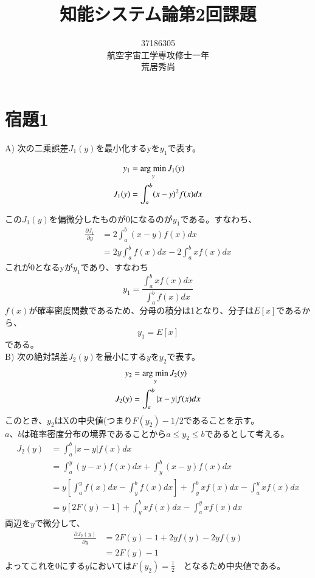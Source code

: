 \documentclass[10pt,a4paper]{ltjsarticle}       %
\title{知能システム論第2回課題}
\author{37186305\\航空宇宙工学専攻修士一年\\荒居秀尚}
\newcommand{\argmin}{\mathop{\rm arg~min}\limits}
\begin{document}
\maketitle
\section{宿題1}
A) 次の二乗誤差$J_1(y)$を最小化するyを$y_1$で表す。

\begin{align}
y_1 &= \argmin_{y} J_1(y) \\
J_1(y)&=\int_a^b (x-y)^2 f(x)dx
\end{align}

この$J_1(y)$を偏微分したものが0になるのが$y_1$である。すなわち、
\begin{align}
\frac{\partial J_1}{\partial y} &= 2\int_a^b(x-y)f(x)dx \\
 &= 2y\int_a^bf(x)dx-2\int_a^b x f(x) dx
\end{align}
これが0となるyが$y_1$であり、すなわち
\begin{equation}
y_1=\frac{\int_a^b x f(x) dx}{\int_a^bf(x)dx}
\end{equation}
$f(x)$が確率密度関数であるため、分母の積分は1となり、分子は$E[x]$であるから、
\begin{equation}
y_1=E[x]
\end{equation}
である。\\
B) 次の絶対誤差$J_2(y)$を最小にする$y$を$y_2$で表す。
\begin{align}
y_2&=\argmin_{y}J_2(y) \\
J_2(y)&=\int_a^b |x-y| f(x) dx
\end{align}
このとき、$y_2$はXの中央値(つまり$F(y_2)-1/2$であることを示す。\\

$a$、$b$は確率密度分布の境界であることから$a\le y_2\le b$であるとして考える。
\begin{align}
J_2(y) &= \int_a^b |x - y| f(x) dx \\
           &= \int_a^y (y - x) f(x) dx + \int_y^b (x - y) f(x) dx \\
           &= y\left[ \int_a^y f(x) dx - \int_y^b f(x) dx \right] + \int_y^b x f(x) dx - \int_a^y x f(x) dx \\
           &= y\left[ 2F(y) - 1 \right] + \int_y^b x f(x) dx - \int_a^y x f(x) dx
\end{align}
両辺を$y$で微分して、
\begin{align}
\frac{\partial J_2(y)}{\partial y} &= 2F(y) - 1 + 2y f(y) - 2y f(y) \\
                                                &= 2F(y) - 1
\end{align}
よってこれを0にする$y$においては$F(y_2)=\frac{1}{2}$  となるため中央値である。
\end{document}
